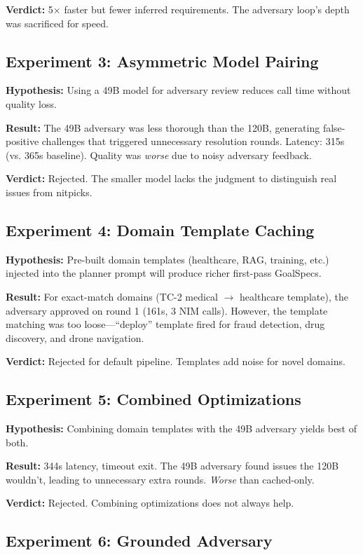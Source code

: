 \documentclass[conference]{IEEEtran}
\begin{document}
\textbf{Verdict:} 5$\times$ faster but fewer inferred requirements. The adversary loop's depth was sacrificed for speed.

\subsection{Experiment 3: Asymmetric Model Pairing}

\textbf{Hypothesis:} Using a 49B model for adversary review reduces call time without quality loss.

\textbf{Result:} The 49B adversary was less thorough than the 120B, generating false-positive challenges that triggered unnecessary resolution rounds. Latency: 315s (vs. 365s baseline). Quality was \textit{worse} due to noisy adversary feedback.

\textbf{Verdict:} Rejected. The smaller model lacks the judgment to distinguish real issues from nitpicks.

\subsection{Experiment 4: Domain Template Caching}

\textbf{Hypothesis:} Pre-built domain templates (healthcare, RAG, training, etc.) injected into the planner prompt will produce richer first-pass GoalSpecs.

\textbf{Result:} For exact-match domains (TC-2 medical $\rightarrow$ healthcare template), the adversary approved on round 1 (161s, 3 NIM calls). However, the template matching was too loose---``deploy'' template fired for fraud detection, drug discovery, and drone navigation.

\textbf{Verdict:} Rejected for default pipeline. Templates add noise for novel domains.

\subsection{Experiment 5: Combined Optimizations}

\textbf{Hypothesis:} Combining domain templates with the 49B adversary yields best of both.

\textbf{Result:} 344s latency, timeout exit. The 49B adversary found issues the 120B wouldn't, leading to unnecessary extra rounds. \textit{Worse} than cached-only.

\textbf{Verdict:} Rejected. Combining optimizations does not always help.

\subsection{Experiment 6: Grounded Adversary}
\end{document}
